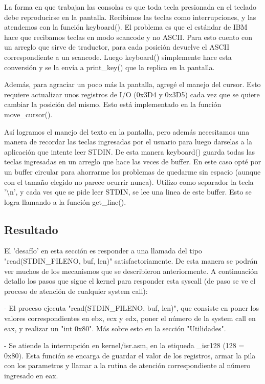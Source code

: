 La forma en que trabajan las consolas es que toda tecla presionada en el
teclado debe reproducirse en la pantalla. Recibimos las teclas como
interrupciones, y las atendemos con la función keyboard(). El problema es que el
estándar de IBM hace que recibamos teclas en modo scancode y no ASCII. Para
esto cuento con un arreglo que sirve de traductor, para cada posición devuelve
el ASCII correspondiente a un scancode. Luego keyboard() simplemente hace esta
conversión y se la envía a print\_key() que la replica en la pantalla.

Además, para agraciar un poco más la pantalla, agregé el manejo del cursor.
Esto requiere actualizar unos registros de I/O (0x3D4 y 0x3D5) cada vez que se
quiere cambiar la posición del mismo. Esto está implementado en la función
move\_cursor().

Así logramos el manejo del texto en la pantalla, pero además necesitamos una
manera de recordar las teclas ingresadas por el usuario para luego darselas a
la aplicación que intente leer STDIN. De esta manera keyboard() guarda todas
las teclas ingresadas en un arreglo que hace las veces de buffer. En este caso
opté por un buffer circular para ahorrarme los problemas de quedarme sin
espacio (aunque con el tamaño elegido no parece ocurrir nunca). Utilizo como
separador la tecla '\textbackslash n', y cada ves que se pide leer STDIN, se
lee una linea de este buffer. Esto se logra llamando a la función get\_line().

\subsection{Resultado}

El 'desafío' en esta sección es responder a una llamada del tipo
"read(STDIN\_FILENO, buf, len)" satisfactoriamente. De esta manera se podrán
ver muchos de los mecanismos que se describieron anteriormente. A continuación
detallo los pasos que sigue el kernel para responder esta syscall (de paso se
ve el proceso de atención de cualquier system call):

- El proceso ejecuta "read(STDIN\_FILENO, buf, len)", que consiste en poner los
valores correspondientes en ebx, ecx y edx, poner el número de la system call
en eax, y realizar un "int 0x80". Más sobre esto en la sección "Utilidades".

- Se atiende la interrupción en kernel/isr.asm, en la etiqueda \_isr128 (128
= 0x80). Esta función se encarga de guardar el valor de los registros, armar
la pila con los parametros y llamar a la rutina de atención correspondiente
al número ingresado en eax.

